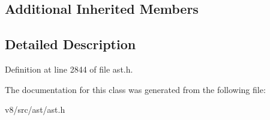 \subsection*{Additional Inherited Members}


\subsection{Detailed Description}


Definition at line 2844 of file ast.\+h.



The documentation for this class was generated from the following file\+:\begin{DoxyCompactItemize}
\item 
v8/src/ast/ast.\+h\end{DoxyCompactItemize}
